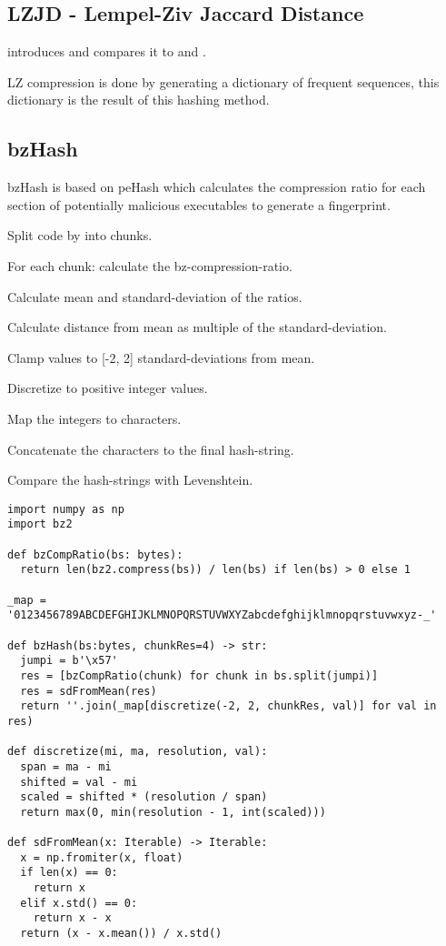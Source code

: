 \documentclass[../main.tex]{subfiles}
\begin{document}
\subsection{LZJD - Lempel-Ziv Jaccard Distance}
 introduces  and compares it to  and .

LZ compression is done by generating a dictionary of frequent sequences, this dictionary is the result of this hashing method.

\subsection{bzHash}
bzHash is based on peHash\cite{wicherski2009pehash} which calculates the compression ratio for each section of potentially malicious executables to generate a fingerprint.

\begin{ol}
  \item Split code by  into chunks.
  \item For each chunk: calculate the bz-compression-ratio.
  \item Calculate mean and standard-deviation of the ratios.
  \item Calculate distance from mean as multiple of the standard-deviation.
  \item Clamp values to [-2, 2] standard-deviations from mean.
  \item Discretize to positive integer values.
  \item Map the integers to characters.
  \item Concatenate the characters to the final hash-string.
  \item Compare the hash-strings with Levenshtein.
\end{ol}

\begin{lstlisting}[style=pymd]
import numpy as np
import bz2

def bzCompRatio(bs: bytes):
  return len(bz2.compress(bs)) / len(bs) if len(bs) > 0 else 1

_map = '0123456789ABCDEFGHIJKLMNOPQRSTUVWXYZabcdefghijklmnopqrstuvwxyz-_'

def bzHash(bs:bytes, chunkRes=4) -> str:
  jumpi = b'\x57'
  res = [bzCompRatio(chunk) for chunk in bs.split(jumpi)]
  res = sdFromMean(res)
  return ''.join(_map[discretize(-2, 2, chunkRes, val)] for val in res)

def discretize(mi, ma, resolution, val):
  span = ma - mi
  shifted = val - mi
  scaled = shifted * (resolution / span)
  return max(0, min(resolution - 1, int(scaled)))

def sdFromMean(x: Iterable) -> Iterable:
  x = np.fromiter(x, float)
  if len(x) == 0:
    return x
  elif x.std() == 0:
    return x - x
  return (x - x.mean()) / x.std()
\end{lstlisting}
\end{document}
